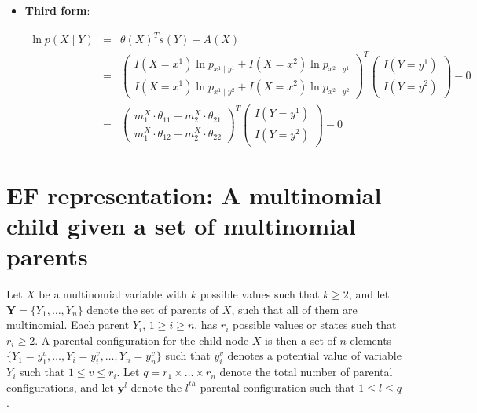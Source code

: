 \documentclass[11pt, oneside]{article}   	%
\numberwithin{figure}{section}
\numberwithin{equation}{section}
\numberwithin{table}{section}
\theoremstyle{definition}
\begin{document}
\begin{appendices}
\begin{itemize}
\item \textbf{Third form}:

\begin{eqnarray*}
\ln p(X \mid Y) &=& \theta(X)^T s(Y) - A(X) \\
&=&
\begin{pmatrix}
I(X=x^1)\ln p_{x^1 \mid y^1}  + I(X=x^2)\ln p_{x^2 \mid y^1}\\
I(X=x^1)\ln p_{x^1 \mid y^2}  + I(X=x^2)\ln p_{x^2 \mid y^2}
\end{pmatrix}^T
\begin{pmatrix}
I(Y=y^1) \\
I(Y=y^2)
\end{pmatrix}
- 0\\
&=&
\begin{pmatrix}
m^X_1 \cdot \theta_{11}  +  m^X_2\cdot \theta_{21}\\
m^X_1 \cdot \theta_{12}  + m^X_2 \cdot \theta_{22}
\end{pmatrix}^T
\begin{pmatrix}
I(Y=y^1) \\
I(Y=y^2)
\end{pmatrix}
- 0
\end{eqnarray*}

\end{itemize}

\newpage
\section{EF representation: A multinomial child given a set of multinomial parents}

Let $X$ be a multinomial variable with $k$ possible values such that $k \geq 2$, and let $\mathbf{Y} =\{Y_1,\ldots,Y_n\}$ denote the set of parents of $X$, such that all of them are multinomial. Each parent $Y_i$, $1 \geq i \geq n$, has $r_i$ possible values or states such that $r_i \geq 2$. A parental configuration for the child-node $X$ is then a set of $n$ elements $\{Y_1 = y_1^{v}, \ldots, Y_i = y_i^{v},\ldots, Y_n = y_n^{v} \}$ such that $y_i^{v}$ denotes a potential value of variable $Y_i$ such that  $1 \leq v \leq r_i$. Let $q = r_1 \times \ldots \times r_n$ denote the total number of parental configurations, and let $\mathbf{y}^l$ denote the $l^{th}$ parental configuration such that $1 \leq l \leq q$.


\end{appendices}
\end{document}
